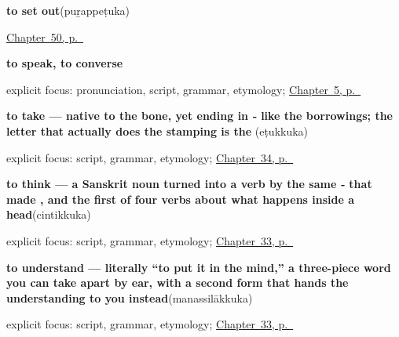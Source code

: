 \noindent\begin{minipage}[t]{\linewidth}
\raggedright
\textbf{to set out}\enspace\emph{}\enspace(puṟappeṭuka)\par
\footnotesize \hyperref[ch:ml-taking-leave]{Chapter~50, p.~\pageref*{ch:ml-taking-leave}}
\end{minipage}\par\smallskip

\noindent\begin{minipage}[t]{\linewidth}
\raggedright
\textbf{to speak, to converse}\enspace\emph{}\par
\footnotesize explicit focus: pronunciation, script, grammar, etymology; \hyperref[ch:first-verbs]{Chapter~5, p.~\pageref*{ch:first-verbs}}
\end{minipage}\par\smallskip

\noindent\begin{minipage}[t]{\linewidth}
\raggedright
\textbf{to take — native to the bone, yet ending in ‑ like the borrowings; the letter that actually does the stamping is the }\enspace\emph{}\enspace(eṭukkuka)\par
\footnotesize explicit focus: script, grammar, etymology; \hyperref[ch:ml-taking-asking-helping-liking]{Chapter~34, p.~\pageref*{ch:ml-taking-asking-helping-liking}}
\end{minipage}\par\smallskip

\noindent\begin{minipage}[t]{\linewidth}
\raggedright
\textbf{to think — a Sanskrit noun turned into a verb by the same ‑ that made , and the first of four verbs about what happens inside a head}\enspace\emph{}\enspace(cintikkuka)\par
\footnotesize explicit focus: script, grammar, etymology; \hyperref[ch:ml-mind-and-page]{Chapter~33, p.~\pageref*{ch:ml-mind-and-page}}
\end{minipage}\par\smallskip

\noindent\begin{minipage}[t]{\linewidth}
\raggedright
\textbf{to understand — literally \textquotedblleft{}to put it in the mind,\textquotedblright{} a three-piece word you can take apart by ear, with a second form that hands the understanding to you instead}\enspace\emph{}\enspace(manassilākkuka)\par
\footnotesize explicit focus: script, grammar, etymology; \hyperref[ch:ml-mind-and-page]{Chapter~33, p.~\pageref*{ch:ml-mind-and-page}}
\end{minipage}\par\smallskip

